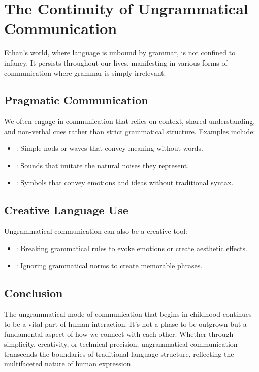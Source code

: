 \section{The Continuity of Ungrammatical Communication}

Ethan's world, where language is unbound by grammar, is not confined to infancy. It persists throughout our lives, manifesting in various forms of communication where grammar is simply irrelevant.

\subsection{Pragmatic Communication}

We often engage in communication that relies on context, shared understanding, and non-verbal cues rather than strict grammatical structure. Examples include:

\begin{itemize}
\item[Gestures]: Simple nods or waves that convey meaning without words.
\item[Onomatopoeia]: Sounds that imitate the natural noises they represent.
\item[Emoji]: Symbols that convey emotions and ideas without traditional syntax.
\end{itemize}

\subsection{Creative Language Use}

Ungrammatical communication can also be a creative tool:

\begin{itemize}
\item[Poetry and Art]: Breaking grammatical rules to evoke emotions or create aesthetic effects.
\item[Advertising]: Ignoring grammatical norms to create memorable phrases.
\end{itemize}


\subsection{Conclusion}

The ungrammatical mode of communication that begins in childhood continues to be a vital part of human interaction. It's not a phase to be outgrown but a fundamental aspect of how we connect with each other. Whether through simplicity, creativity, or technical precision, ungrammatical communication transcends the boundaries of traditional language structure, reflecting the multifaceted nature of human expression.

